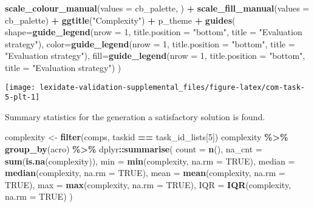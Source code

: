 \documentclass[
]{book}
\newenvironment{Shaded}{\begin{snugshade}}{\end{snugshade}}
\newcommand{\AttributeTok}[1]{\textcolor[rgb]{0.13,0.29,0.53}{#1}}
\newcommand{\ConstantTok}[1]{\textcolor[rgb]{0.56,0.35,0.01}{#1}}
\newcommand{\DecValTok}[1]{\textcolor[rgb]{0.00,0.00,0.81}{#1}}
\newcommand{\FunctionTok}[1]{\textcolor[rgb]{0.13,0.29,0.53}{\textbf{#1}}}
\newcommand{\NormalTok}[1]{#1}
\newcommand{\OtherTok}[1]{\textcolor[rgb]{0.56,0.35,0.01}{#1}}
\newcommand{\SpecialCharTok}[1]{\textcolor[rgb]{0.81,0.36,0.00}{\textbf{#1}}}
\newcommand{\StringTok}[1]{\textcolor[rgb]{0.31,0.60,0.02}{#1}}
\begin{document}
\begin{Shaded}
\begin{Highlighting}[]
  \FunctionTok{scale\_colour\_manual}\NormalTok{(}\AttributeTok{values =}\NormalTok{ cb\_palette, ) }\SpecialCharTok{+}
  \FunctionTok{scale\_fill\_manual}\NormalTok{(}\AttributeTok{values =}\NormalTok{ cb\_palette) }\SpecialCharTok{+}
  \FunctionTok{ggtitle}\NormalTok{(}\StringTok{"Complexity"}\NormalTok{) }\SpecialCharTok{+}
\NormalTok{  p\_theme }\SpecialCharTok{+}
  \FunctionTok{guides}\NormalTok{(}
    \AttributeTok{shape=}\FunctionTok{guide\_legend}\NormalTok{(}\AttributeTok{nrow =} \DecValTok{1}\NormalTok{, }\AttributeTok{title.position =} \StringTok{"bottom"}\NormalTok{,}
                       \AttributeTok{title =} \StringTok{"Evaluation strategy"}\NormalTok{),}
    \AttributeTok{color=}\FunctionTok{guide\_legend}\NormalTok{(}\AttributeTok{nrow =} \DecValTok{1}\NormalTok{, }\AttributeTok{title.position =} \StringTok{"bottom"}\NormalTok{,}
                       \AttributeTok{title =} \StringTok{"Evaluation strategy"}\NormalTok{),}
    \AttributeTok{fill=}\FunctionTok{guide\_legend}\NormalTok{(}\AttributeTok{nrow =} \DecValTok{1}\NormalTok{, }\AttributeTok{title.position =} \StringTok{"bottom"}\NormalTok{,}
                      \AttributeTok{title =} \StringTok{"Evaluation strategy"}\NormalTok{)}
\NormalTok{  )}
\end{Highlighting}
\end{Shaded}

\texttt{[image: lexidate-validation-supplemental\_files/figure-latex/com-task-5-plt-1]}

Summary statistics for the generation a satisfactory solution is found.

\begin{Shaded}
\begin{Highlighting}[]
\NormalTok{complexity }\OtherTok{\textless{}{-}} \FunctionTok{filter}\NormalTok{(comps, taskid }\SpecialCharTok{==}\NormalTok{ task\_id\_lists[}\DecValTok{5}\NormalTok{])}
\NormalTok{complexity }\SpecialCharTok{\%\textgreater{}\%}
  \FunctionTok{group\_by}\NormalTok{(acro) }\SpecialCharTok{\%\textgreater{}\%}
\NormalTok{  dplyr}\SpecialCharTok{::}\FunctionTok{summarise}\NormalTok{(}
    \AttributeTok{count =} \FunctionTok{n}\NormalTok{(),}
    \AttributeTok{na\_cnt =} \FunctionTok{sum}\NormalTok{(}\FunctionTok{is.na}\NormalTok{(complexity)),}
    \AttributeTok{min =} \FunctionTok{min}\NormalTok{(complexity, }\AttributeTok{na.rm =} \ConstantTok{TRUE}\NormalTok{),}
    \AttributeTok{median =} \FunctionTok{median}\NormalTok{(complexity, }\AttributeTok{na.rm =} \ConstantTok{TRUE}\NormalTok{),}
    \AttributeTok{mean =} \FunctionTok{mean}\NormalTok{(complexity, }\AttributeTok{na.rm =} \ConstantTok{TRUE}\NormalTok{),}
    \AttributeTok{max =} \FunctionTok{max}\NormalTok{(complexity, }\AttributeTok{na.rm =} \ConstantTok{TRUE}\NormalTok{),}
    \AttributeTok{IQR =} \FunctionTok{IQR}\NormalTok{(complexity, }\AttributeTok{na.rm =} \ConstantTok{TRUE}\NormalTok{)}
\NormalTok{  )}
\end{Highlighting}
\end{Shaded}
\end{document}
